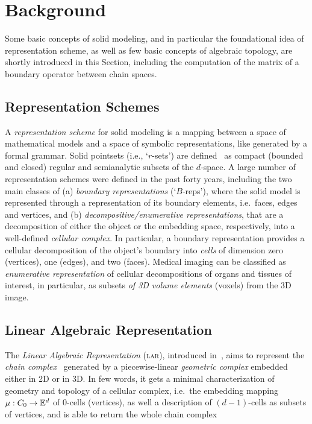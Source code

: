 \documentclass[11pt, oneside]{amsart}   	%
\begin{document}
%
\section{Background}\label{sec:background}

Some basic concepts of solid modeling, and in particular the foundational idea of representation scheme, as well as few basic concepts of algebraic topology, are shortly introduced in this Section, including the computation of the matrix of a boundary operator between chain spaces.

\subsection{Representation Schemes}\label{sec:schemes}

A \emph{representation scheme} for solid modeling is a mapping between a space of mathematical models and a space of symbolic representations, like generated by a formal grammar.
Solid pointsets (i.e., `$r$-sets') are defined~\cite{Requicha:1980:RRS:356827.356833} as compact (bounded and closed) regular and semianalytic subsets of the $d$-space. A large number of representation schemes were defined in the past forty years, including the two main classes of (a) \emph{boundary representations} (`$B$-reps'), where the solid model is represented through a representation of its boundary elements, i.e.~faces, edges and vertices, and (b) \emph{decompositive/enumerative representations}, that are a decomposition of either the object or the embedding space, respectively, into a well-defined \emph{cellular complex}. In particular, a boundary representation provides a cellular decomposition of the object's boundary into \emph{cells} of dimension zero (vertices), one (edges), and two (faces). Medical imaging can be classified as \emph{enumerative representation} of cellular decompositions of organs and tissues of interest, in particular, as subsets \emph{of 3D volume elements} (voxels) from the 3D image. 


\subsection{Linear Algebraic Representation}\label{sec:lar}

The \emph{Linear Algebraic Representation} (\textsc{lar}), introduced in~\cite{Dicarlo:2014:TNL:2543138.2543294}, aims to represent the \emph{chain complex}~\cite{TSAS} generated by a piecewise-linear \emph{geometric complex} embedded either in 2D or in 3D. In few words, it gets a minimal characterization of geometry and topology of a cellular complex, i.e.~the embedding mapping $\mu : C_0 \to \mathbb{E}^d$ of 0-cells (vertices), as well a description of $(d-1)$-cells as subsets of vertices, and is able to return the whole chain complex 
\end{document}
